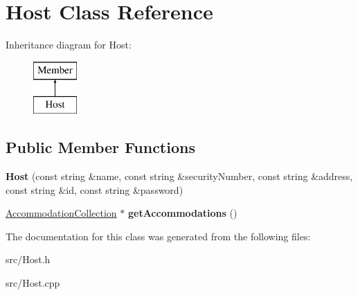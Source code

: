 \hypertarget{class_host}{}\section{Host Class Reference}
\label{class_host}
Inheritance diagram for Host\+:\begin{figure}[H]
\begin{center}
\leavevmode
\includegraphics[height=2.000000cm]{class_host}
\end{center}
\end{figure}
\subsection*{Public Member Functions}
\begin{DoxyCompactItemize}
\item 
\mbox{\label{class_host_a9f21538946cb995974ab3512de663ccd}} 
{\bfseries Host} (const string \&name, const string \&security\+Number, const string \&address, const string \&id, const string \&password)
\item 
\mbox{\label{class_host_a6c9ac82f8263c26b0382ae6b3b52b82d}} 
\mbox{\hyperlink{class_accommodation_collection}{Accommodation\+Collection}} $\ast$ {\bfseries get\+Accommodations} ()
\end{DoxyCompactItemize}


The documentation for this class was generated from the following files\+:\begin{DoxyCompactItemize}
\item 
src/Host.\+h\item 
src/Host.\+cpp\end{DoxyCompactItemize}
